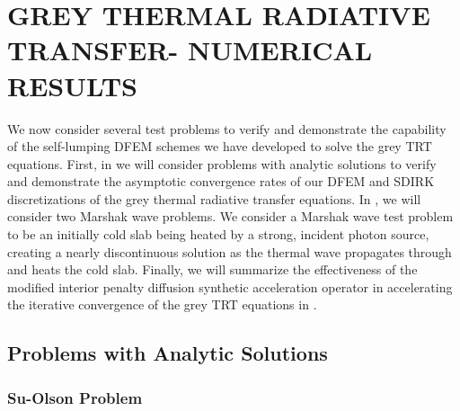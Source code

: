 %
%
%



\chapter{\uppercase{Grey Thermal Radiative Transfer- Numerical Results}}
\label{sec:chapter6_grey_radtran_results}


We now consider several test problems to verify and demonstrate the capability of the self-lumping DFEM schemes we have developed to solve the grey TRT equations.
First, in  we will consider problems with analytic solutions to verify and demonstrate the asymptotic convergence rates of our DFEM and SDIRK discretizations of the grey thermal radiative transfer equations.
In , we will consider two Marshak wave problems.  
We consider a Marshak wave test problem to be an initially cold slab being heated by a strong, incident photon source,  creating a nearly discontinuous solution as the thermal wave propagates through and heats the cold slab.
Finally, we will summarize the effectiveness of the modified interior penalty diffusion synthetic acceleration operator in accelerating the iterative convergence of the grey TRT equations in .


\section{Problems with Analytic Solutions}
\label{sec:chap6_analytic_results}


\subsection{Su-Olson Problem}

